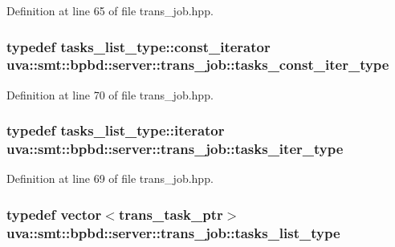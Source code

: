 Definition at line 65 of file trans\+\_\+job.\+hpp.

\hypertarget{classuva_1_1smt_1_1bpbd_1_1server_1_1trans__job_ac1153b7924858b7cd9d7cb30d7586206}{}
\subsubsection[{tasks\+\_\+const\+\_\+iter\+\_\+type}]{\setlength{\rightskip}{0pt plus 5cm}typedef tasks\+\_\+list\+\_\+type\+::const\+\_\+iterator {\bf uva\+::smt\+::bpbd\+::server\+::trans\+\_\+job\+::tasks\+\_\+const\+\_\+iter\+\_\+type}}\label{classuva_1_1smt_1_1bpbd_1_1server_1_1trans__job_ac1153b7924858b7cd9d7cb30d7586206}


Definition at line 70 of file trans\+\_\+job.\+hpp.

\hypertarget{classuva_1_1smt_1_1bpbd_1_1server_1_1trans__job_a3e7878af85efafacb0af16bf5a13bb4a}{}
\subsubsection[{tasks\+\_\+iter\+\_\+type}]{\setlength{\rightskip}{0pt plus 5cm}typedef tasks\+\_\+list\+\_\+type\+::iterator {\bf uva\+::smt\+::bpbd\+::server\+::trans\+\_\+job\+::tasks\+\_\+iter\+\_\+type}}\label{classuva_1_1smt_1_1bpbd_1_1server_1_1trans__job_a3e7878af85efafacb0af16bf5a13bb4a}


Definition at line 69 of file trans\+\_\+job.\+hpp.

\hypertarget{classuva_1_1smt_1_1bpbd_1_1server_1_1trans__job_a8d6020c8c7d17ba4bbb71fd85df6791d}{}
\subsubsection[{tasks\+\_\+list\+\_\+type}]{\setlength{\rightskip}{0pt plus 5cm}typedef vector$<${\bf trans\+\_\+task\+\_\+ptr}$>$ {\bf uva\+::smt\+::bpbd\+::server\+::trans\+\_\+job\+::tasks\+\_\+list\+\_\+type}}\label{classuva_1_1smt_1_1bpbd_1_1server_1_1trans__job_a8d6020c8c7d17ba4bbb71fd85df6791d}


